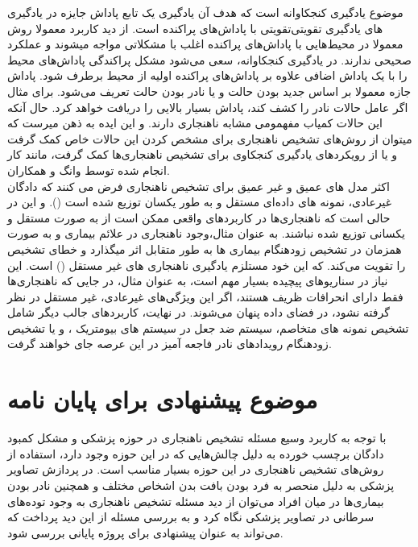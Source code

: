 \documentclass[12pt,a4paper]{report}
\theoremstyle{definition}
\theoremstyle{definition}
\begin{document}
موضوع یادگیری کنجکاوانه است\cite{https://doi.org/10.48550/arxiv.1810.12894, https://doi.org/10.48550/arxiv.1808.04355, https://doi.org/10.48550/arxiv.1705.05363} که هدف آن یادگیری یک تابع پاداش جایزه در یادگیری تقویتی با پاداش‌های پراکنده است. از دید کاربرد معمولا روش‌‎های یادگیری تقویتی معمولا در محیط‌هایی با پاداش‌های پراکنده اغلب با مشکلاتی مواجه میشوند و عملکرد صحیحی ندارند. در یادگیری کنجکاوانه، سعی می‌شود مشکل پراکندگی پاداش‌های محیط را با یک پاداش اضافی علاوه بر پاداش‌های پراکنده اولیه از محیط برطرف شود. پاداش جازه معمولا بر اساس جدید بودن حالت و یا نادر بودن حالت تعریف می‌شود. برای مثال اگر عامل حالات نادر را کشف کند، پاداش بسیار بالایی را دریافت خواهد کرد. حال آنکه این حالات کمیاب مفهمومی مشابه ناهنجاری دارند. و این ایده به ذهن میرست که میتوان از روش‌های تشخیص ناهنجاری برای مشخص کردن این حالات خاص کمک گرفت و یا از رویکرد‌های یادگیری کنجکاوی برای تشخیص ناهنجاری‌ها کمک گرفت، مانند کار انجام شده توسط وانگ و همکاران\cite{ijcai2020p408}.\\

اکثر مدل های عمیق و غیر عمیق برای تشخیص ناهنجاری فرض می کنند که دادگان غیرعادی، نمونه های داده‌ای مستقل و به طور یکسان توزیع شده است (). و این در حالی است که ناهنجاری‌ها در کاربرد‌های واقعی ممکن است از به صورت مستقل و یکسانی توزیع شده نباشند. به عنوان مثال،وجود ناهنجاری در علائم بیماری و به صورت همزمان در تشخیص زودهنگام بیماری ها به طور متقابل اثر میگذارد و خطای تشخیص را تقویت می‌کند. که این خود مستلزم یادگیری ناهنجاری های غیر مستقل () است\cite{Pang2019NonIIDOD}. این نیاز در سناریوهای پیچیده بسیار مهم است، به عنوان مثال، در جایی که ناهنجاری‌ها فقط دارای انحرافات ظریف هستند،‌ اگر این ویژگی‌های غیرعادی، غیر مستقل در نظر گرفته نشود، در فضای داده پنهان می‌شوند. در نهایت، کاربردهای جالب دیگر شامل تشخیص نمونه های متخاصم\cite{https://doi.org/10.48550/arxiv.1702.06280, https://doi.org/10.48550/arxiv.1802.03041}، سیستم ضد جعل در سیستم های بیومتریک \cite{KittlerJosef2020ASEf, PrezCabo2019DeepAD}، و یا تشخیص زودهنگام رویدادهای نادر فاجعه آمیز در این عرصه جای خواهند گرفت.
	\section{موضوع پیشنهادی برای پایان نامه}
با توجه به کاربرد وسیع مسئله تشخیص ناهنجاری در حوزه پزشکی و مشکل کمبود دادگان برچسب خورده به دلیل چالش‌هایی که در این حوزه وجود دارد، استفاده از روش‌های تشخیص ناهنجاری در این حوزه بسیار مناسب است. در پردازش تصاویر پزشکی به دلیل منحصر به فرد بودن بافت بدن اشخاص مختلف و همچنین نادر بودن بیماری‌ها در میان افراد می‌توان از دید مسئله تشخیص ناهنجاری به وجود توده‌های سرطانی در تصاویر پزشکی نگاه کرد و به بررسی مسئله از این دید پرداخت که می‌تواند به عنوان پیشنهادی برای پروژه پایانی بررسی شود.
	
\end{document}

